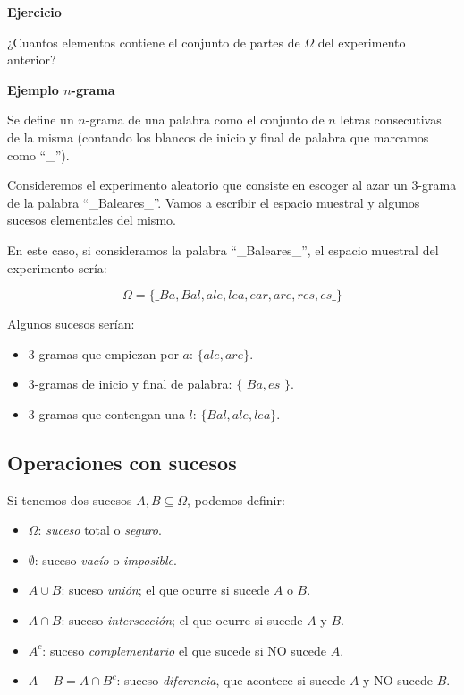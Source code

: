 \documentclass[]{book}
\providecommand{\tightlist}{%
  \setlength{\itemsep}{0pt}\setlength{\parskip}{0pt}}
\begin{document}
\textbf{Ejercicio}

¿Cuantos elementos contiene el conjunto de partes de \(\Omega\) del experimento anterior?

\textbf{Ejemplo \(n\)-grama}

Se define un \(n\)-grama de una palabra como el conjunto de \(n\) letras consecutivas de la misma (contando los blancos de inicio y final de palabra que marcamos como ``\_'').

Consideremos el experimento aleatorio que consiste en escoger al azar un 3-grama de la palabra ``\_Baleares\_''. Vamos a escribir el espacio muestral y algunos sucesos elementales del mismo.

En este caso, si consideramos la palabra ``\_Baleares\_'', el espacio muestral del experimento sería:

\[\Omega=\{\_Ba, Bal, ale, lea, ear, are, res, es\_\}\]

Algunos sucesos serían:

\begin{itemize}
\tightlist
\item
  3-gramas que empiezan por \(a\): \(\{ale,are\}\).
\item
  3-gramas de inicio y final de palabra: \(\{\_Ba,es\_\}\).
\item
  3-gramas que contengan una \(l\): \(\{Bal,ale,lea\}\).
\end{itemize}

\hypertarget{operaciones-con-sucesos}{%
\subsection{Operaciones con sucesos}\label{operaciones-con-sucesos}}

Si tenemos dos sucesos \(A,B\subseteq \Omega\), podemos definir:

\begin{itemize}
\tightlist
\item
  \(\Omega\): \emph{suceso} total o \emph{seguro}.
\item
  \(\emptyset\): suceso \emph{vacío} o \emph{imposible}.
\item
  \(A\cup B\): suceso \emph{unión}; el que ocurre si sucede \(A\) o \(B\).
\item
  \(A\cap B\): suceso \emph{intersección}; el que ocurre si sucede \(A\) y \(B\).
\item
  \(A^c\): suceso \emph{complementario} el que sucede si NO sucede \(A\).
\item
  \(A- B=A\cap B^c\): suceso \emph{diferencia}, que acontece si sucede \(A\) y NO sucede \(B\).
\end{itemize}
\end{document}
